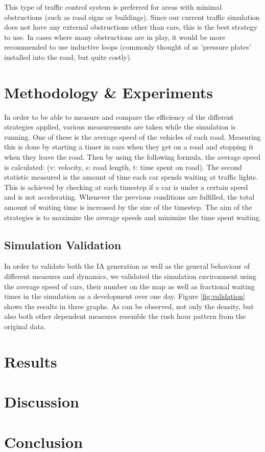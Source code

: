 \documentclass[10pt]{article}
\begin{document}
This type of traffic control system is preferred for areas with minimal obstructions (such as road signs or buildings).  Since our current traffic simulation does not have any external obstructions other than cars, this is the best strategy to use.  In cases where many obstructions are in play, it would be more recommended to use inductive loops (commonly thought of as 'pressure plates' installed into the road, but quite costly).

\section{Methodology \& Experiments}
\label{sec:experiments}

In order to be able to measure and compare the efficiency of the different strategies applied, various measurements are taken while the simulation is running. One of these is the average speed of the vehicles of each road. Measuring this is done by starting a timer in cars when they get on a road and stopping it when they leave the road. Then by using the following formula, the average speed is calculated:   (v: velocity, s: road length, t: time spent on road). The second statistic measured is the amount of time each car spends waiting at traffic lights. This is achieved by checking at each timestep if a car is under a certain speed and is not accelerating. Whenever the previous conditions are fulfilled, the total amount of waiting time is increased by the size of the timestep. The aim of the strategies is to maximize the average speeds and minimize the time spent waiting.

\subsection{Simulation Validation}
In order to validate both the IA generation as well as the general behaviour of different measures and dynamics, we validated the simulation environment using the average speed of cars, their number on the map as well as fractional waiting times in the simulation as a development over one day. Figure \ref{fig:validation} shows the results in three graphs. As can be observed, not only the density, but also both other dependent measures resemble the rush hour pattern from the original data.

\section{Results}
\label{sec:results}

\section{Discussion}
\label{sec:discussion}

\section{Conclusion}
\label{sec:conclusion}

{\tiny\printbibliography}
\end{document}
